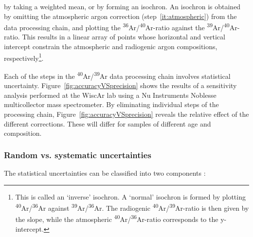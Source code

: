 \documentclass{article}
\begin{document}
\begin{enumerate}
  by taking a weighted mean, or by forming an isochron. An isochron is
  obtained by omitting the atmospheric argon correction
  (step~\ref{it:atmospheric}) from the data processing chain, and
  plotting the \textsuperscript{36}Ar/\textsuperscript{40}Ar-ratio
  against the
  \textsuperscript{39}Ar/\textsuperscript{40}Ar-ratio. This results in
  a linear array of points whose horizontal and vertical intercept
  constrain the atmospheric and radiogenic argon compositions,
  respectively\footnote{This is called an `inverse' isochron. A
    `normal' isochron is formed by plotting
    \textsuperscript{40}Ar/\textsuperscript{36}Ar against
    \textsuperscript{39}Ar/\textsuperscript{36}Ar. The radiogenic
    \textsuperscript{40}Ar/\textsuperscript{39}Ar-ratio is then given
    by the slope, while the atmospheric
    \textsuperscript{40}Ar/\textsuperscript{36}Ar-ratio corresponds to
    the y-intercept.}.
\end{enumerate}

Each of the steps in the \textsuperscript{40}Ar/\textsuperscript{39}Ar
data processing chain involves statistical uncertainty.
Figure~\ref{fig:accuracyVSprecision} shows the results of a
sensitivity analysis performed at the WiscAr lab using a Nu
Instruments Noblesse multicollector mass spectrometer.  By eliminating
individual steps of the processing chain,
Figure~\ref{fig:accuracyVSprecision} reveals the relative effect of
the different corrections. These will differ for samples of different
age and composition.

\subsubsection{Random vs. systematic uncertainties}
\label{sec:randomVSsystematic}

The statistical uncertainties can be classified into two components
\citep{renne1998}:
\end{document}
